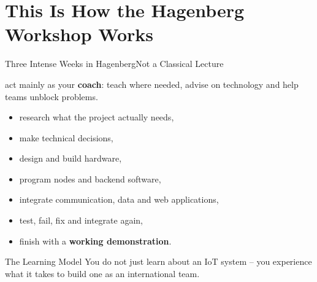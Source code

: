 \part[nopartpage]{This Is How the Hagenberg Workshop Works}

\begin{frame}{Three Intense Weeks in Hagenberg}{Not a Classical Lecture}
\begin{description}
    \item[I will] act mainly as your \textbf{coach}: teach where needed, advise on technology and help teams unblock problems.
    \item[You will]
    \begin{itemize}
        \item research what the project actually needs,
        \item make technical decisions,
        \item design and build hardware,
        \item program nodes and backend software,
        \item integrate communication, data and web applications,
        \item test, fail, fix and integrate again,
        \item finish with a \textbf{working demonstration}.
    \end{itemize}
\end{description}
\begin{block}{The Learning Model}
You do not just learn about an IoT system -- you experience what it takes to build one as an international team.
\end{block}
\end{frame}
